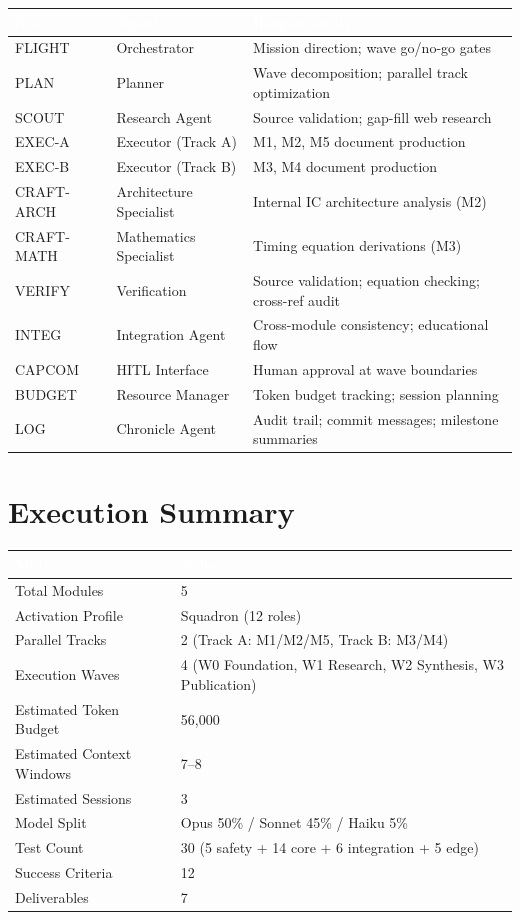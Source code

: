 \documentclass[11pt,letterpaper]{article}
\newcommand{\tableheader}[1]{\textbf{\sffamily\textcolor{white}{#1}}}
\begin{document}
\begin{center}
\begin{tabularx}{\textwidth}{L{2.5cm}L{2.5cm}X}
\toprule
{}
\tableheader{Role} & \tableheader{Agent} & \tableheader{Responsibility} \\
\midrule
FLIGHT & Orchestrator & Mission direction; wave go/no-go gates \\
PLAN & Planner & Wave decomposition; parallel track optimization \\
SCOUT & Research Agent & Source validation; gap-fill web research \\
EXEC-A & Executor (Track A) & M1, M2, M5 document production \\
EXEC-B & Executor (Track B) & M3, M4 document production \\
CRAFT-ARCH & Architecture Specialist & Internal IC architecture analysis (M2) \\
CRAFT-MATH & Mathematics Specialist & Timing equation derivations (M3) \\
VERIFY & Verification & Source validation; equation checking; cross-ref audit \\
INTEG & Integration Agent & Cross-module consistency; educational flow \\
CAPCOM & HITL Interface & Human approval at wave boundaries \\
BUDGET & Resource Manager & Token budget tracking; session planning \\
LOG & Chronicle Agent & Audit trail; commit messages; milestone summaries \\
\bottomrule
\end{tabularx}
\end{center}

\section{Execution Summary}

\begin{center}
\begin{tabularx}{\textwidth}{L{5cm}X}
\toprule
{}
\tableheader{Metric} & \tableheader{Value} \\
\midrule
Total Modules & 5 \\
Activation Profile & Squadron (12 roles) \\
Parallel Tracks & 2 (Track A: M1/M2/M5, Track B: M3/M4) \\
Execution Waves & 4 (W0 Foundation, W1 Research, W2 Synthesis, W3 Publication) \\
Estimated Token Budget & 56,000 \\
Estimated Context Windows & 7--8 \\
Estimated Sessions & 3 \\
Model Split & Opus 50\% / Sonnet 45\% / Haiku 5\% \\
Test Count & 30 (5 safety + 14 core + 6 integration + 5 edge) \\
Success Criteria & 12 \\
Deliverables & 7 \\
\bottomrule
\end{tabularx}
\end{center}
\end{document}
